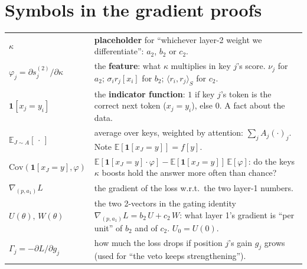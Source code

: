 \documentclass[11pt]{article}
\newcommand{\1}{\mathbf{1}}
\begin{document}
\section{Symbols in the gradient proofs}
\begin{center}
\begin{tabular}{>{\raggedright}p{2.6cm}p{11.8cm}}
\toprule
$\kappa$ & \textbf{placeholder} for ``whichever layer-2 weight we differentiate'': $a_2$, $b_2$ or $c_2$.\\
$\varphi_j=\partial s^{(2)}_j/\partial\kappa$ & the \textbf{feature}: what $\kappa$ multiplies in key $j$'s score. $\nu_j$ for $a_2$; $\sigma_ir_j[x_i]$ for $b_2$; $\langle r_i,r_j\rangle_S$ for $c_2$.\\
$\1[x_j=y_i]$ & the \textbf{indicator function}: $1$ if key $j$'s token is the correct next token ($x_j=y_i$), else $0$. A fact about the data.\\
$\mathbb E_{J\sim A}[\,\cdot\,]$ & average over keys, weighted by attention: $\sum_jA_j(\cdot)_j$. Note $\mathbb E[\1[x_J=y]]=f[y]$.\\
$\mathrm{Cov}(\1[x_J=y],\varphi)$ & $\mathbb E[\1[x_J=y]\cdot\varphi]-\mathbb E[\1[x_J=y]]\,\mathbb E[\varphi]$: do the keys $\kappa$ boosts hold the answer more often than chance?\\
$\nabla_{(p,a_1)}L$ & the gradient of the loss w.r.t.\ the two layer-1 numbers.\\
$U(\theta),\,W(\theta)$ & the two 2-vectors in the gating identity $\nabla_{(p,a_1)}L=b_2\,U+c_2\,W$: what layer 1's gradient is ``per unit'' of $b_2$ and of $c_2$. $U_0=U(0)$.\\
$\Gamma_j=-\partial L/\partial g_j$ & how much the loss drops if position $j$'s gain $g_j$ grows (used for ``the veto keeps strengthening'').\\
\bottomrule
\end{tabular}
\end{center}
\end{document}
